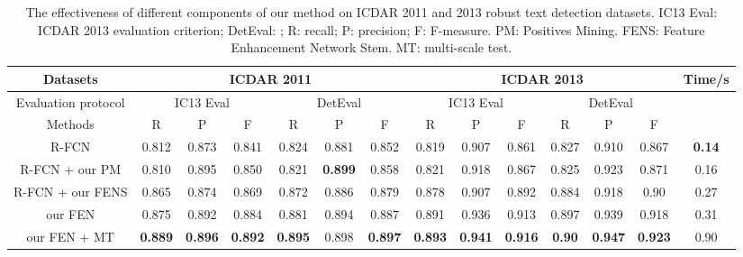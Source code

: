 \documentclass[letterpaper]{article}
\begin{document}
\begin{table*}[!htp]
\caption{The effectiveness of different components of our method on ICDAR 2011 and 2013 robust text detection datasets. IC13 Eval: ICDAR 2013 evaluation criterion; DetEval: \cite{wolf2006object}; R: recall; P: precision; F: F-measure. PM: Positives Mining. FENS: Feature Enhancement Network Stem. MT: multi-scale test.}
\scriptsize
\begin{center}
\begin{tabular}{|c|c|c|c|c|c|c|c|c|c|c|c|c|c|c|c|c|}
\hline
\multicolumn{4}{|c|}{Datasets} & \multicolumn{6}{|c|}{ICDAR 2011} & \multicolumn{6}{|c|}{ICDAR 2013} & Time\slash s\\
\hline
\multicolumn{4}{|c|}{Evaluation protocol} & \multicolumn{3}{|c|}{IC13 Eval} & \multicolumn{3}{|c|}{DetEval} & \multicolumn{3}{|c|}{IC13 Eval} & \multicolumn{3}{|c|}{DetEval} & \\
\hline
\multicolumn{4}{|c|}{Methods} & R & P & F & R & P & F & R & P & F & R & P & F & \\
\hline
\multicolumn{4}{|c|}{R-FCN \cite{dai2016r}} & 0.812 & 0.873 & 0.841 & 0.824 & 0.881 & 0.852 & 0.819 & 0.907 & 0.861 & 0.827 & 0.910 & 0.867 & \textbf{0.14}\\
\hline
\multicolumn{4}{|c|}{R-FCN + our PM} & 0.810 & 0.895 & 0.850 & 0.821 & \textbf{0.899} & 0.858 & 0.821 & 0.918 & 0.867 & 0.825 & 0.923 & 0.871 & 0.16\\
\hline
\multicolumn{4}{|c|}{R-FCN + our FENS} & 0.865 & 0.874 & 0.869 & 0.872 & 0.886 & 0.879 & 0.878 & 0.907 & 0.892 & 0.884 & 0.918 & 0.90 & 0.27\\
\hline
\multicolumn{4}{|c|}{our FEN} & 0.875 & 0.892 & 0.884 & 0.881 & 0.894 & 0.887 & 0.891 & 0.936 & 0.913 & 0.897 & 0.939 & 0.918 & 0.31\\
\hline
\multicolumn{4}{|c|}{our FEN + MT} & \textbf{0.889} & \textbf{0.896} & \textbf{0.892} & \textbf{0.895} & 0.898 & \textbf{0.897} & \textbf{0.893} & \textbf{0.941} & \textbf{0.916} & \textbf{0.90} & \textbf{0.947} & \textbf{0.923} & 0.90\\
\hline
\end{tabular}
\end{center}
\label{tab:self}
\end{table*}
\end{document}

